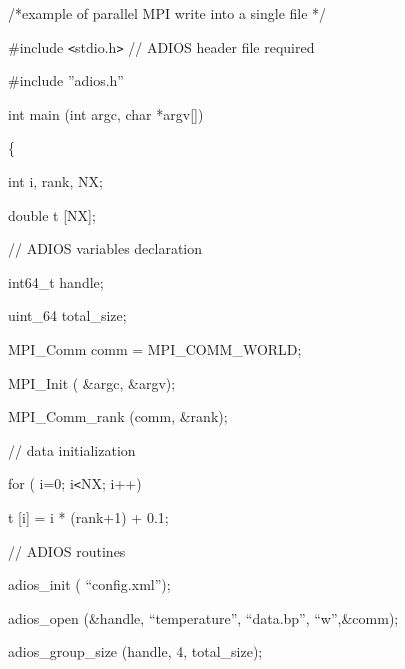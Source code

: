 \vspace{22pt}
/*example of parallel MPI write into a single file */

\vspace{10pt}
\#include \texttt{<}stdio.h\texttt{>}    // ADIOS header file required

\vspace{10pt}
\#include ''adios.h''

\vspace{10pt}
int main (int argc, char *argv[])

\vspace{10pt}
\{

\vspace{10pt}
\parindent=14pt
int i, rank, NX;

\vspace{10pt}
double t [NX];

\vspace{10pt}
\parindent=28pt
// ADIOS variables declaration

\vspace{10pt}
\parindent=14pt
int64\_t handle;

\vspace{10pt}
uint\_64 total\_size;

\vspace{10pt}
\parindent=28pt
MPI\_Comm comm = MPI\_COMM\_WORLD;

\vspace{22pt}
\parindent=14pt
MPI\_Init ( \&argc, \&argv);

\vspace{10pt}
MPI\_Comm\_rank (comm, \&rank); 

\vspace{22pt}
\parindent=28pt
// data initialization

\vspace{10pt}
\parindent=14pt
for ( i=0; i\texttt{<}NX; i++)

\vspace{10pt}
\parindent=28pt
t [i] = i * (rank+1) + 0.1;

\vspace{22pt}
\parindent=14pt
// ADIOS routines

\vspace{10pt}
adios\_init ( ``config.xml'');

\vspace{10pt}
\parindent=28pt
adios\_open (\&handle, ``temperature'', ``data.bp'', ``w'',\&comm);

\vspace{10pt}
\parindent=14pt
adios\_group\_size (handle, 4, total\_size);

